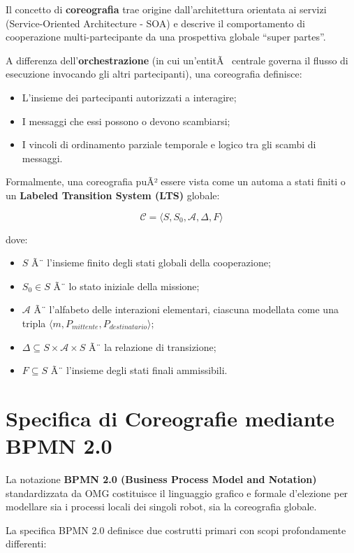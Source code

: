 ﻿\documentclass[11pt, a4paper]{report}
\begin{document}
Il concetto di \textbf{coreografia} trae origine dall'architettura orientata ai servizi (Service-Oriented Architecture - SOA) e descrive il comportamento di cooperazione multi-partecipante da una prospettiva globale ``super partes''. 

A differenza dell'\textbf{orchestrazione} (in cui un'entitÃ  centrale governa il flusso di esecuzione invocando gli altri partecipanti), una coreografia definisce:
\begin{itemize}
    \item L'insieme dei partecipanti autorizzati a interagire;
    \item I messaggi che essi possono o devono scambiarsi;
    \item I vincoli di ordinamento parziale temporale e logico tra gli scambi di messaggi.
\end{itemize}

Formalmente, una coreografia puÃ² essere vista come un automa a stati finiti o un \textbf{Labeled Transition System (LTS)} globale:

$$\mathcal{C} = \langle S, S_0, \mathcal{A}, \Delta, F \rangle$$

dove:
\begin{itemize}
    \item $S$ Ã¨ l'insieme finito degli stati globali della cooperazione;
    \item $S_0 \in S$ Ã¨ lo stato iniziale della missione;
    \item $\mathcal{A}$ Ã¨ l'alfabeto delle interazioni elementari, ciascuna modellata come una tripla $\langle m, P_{mittente}, P_{destinatario} \rangle$;
    \item $\Delta \subseteq S \times \mathcal{A} \times S$ Ã¨ la relazione di transizione;
    \item $F \subseteq S$ Ã¨ l'insieme degli stati finali ammissibili.
\end{itemize}

\section{Specifica di Coreografie mediante BPMN 2.0}

La notazione \textbf{BPMN 2.0 (Business Process Model and Notation)} standardizzata da OMG costituisce il linguaggio grafico e formale d'elezione per modellare sia i processi locali dei singoli robot, sia la coreografia globale.

La specifica BPMN 2.0 definisce due costrutti primari con scopi profondamente differenti:
\end{document}
